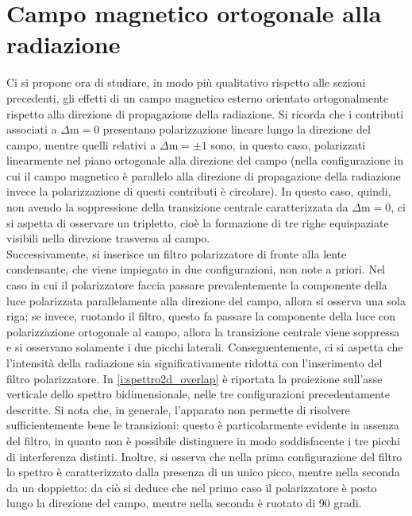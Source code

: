 \documentclass[twocolumn,10pt]{asme2ej}
\begin{document}


\vspace{-10pt}
\section{Campo magnetico ortogonale alla radiazione}\label{s:ortogonale}

Ci si propone ora di studiare, in modo più qualitativo rispetto alle sezioni precedenti, gli effetti di un campo
magnetico esterno orientato ortogonalmente rispetto alla direzione di propagazione della radiazione. Si  ricorda che i
contributi associati a $\Delta \text{m} = 0$ presentano polarizzazione lineare lungo la direzione del campo, mentre
quelli relativi a $\Delta \text{m} = \pm 1$ sono, in questo caso, polarizzati linearmente nel piano ortogonale alla
direzione del campo (nella configurazione in cui il campo magnetico è parallelo alla direzione di propagazione della
radiazione invece la polarizzazione di questi contributi è circolare). In questo caso, quindi, non avendo la
soppressione della transizione centrale caratterizzata da $\Delta \text{m} = 0$, ci si aspetta di osservare un
tripletto, cioè la formazione di tre righe equispaziate visibili nella direzione trasversa al campo. \\
Successivamente, si inserisce un filtro polarizzatore di fronte alla lente condensante, che viene impiegato in due
configurazioni, non note a priori. Nel caso in cui il polarizzatore faccia passare prevalentemente la componente della
luce polarizzata parallelamente alla direzione del campo, allora si osserva una sola riga; se invece, ruotando il
filtro, questo fa passare la componente della luce con polarizzazione ortogonale al campo, allora la transizione
centrale viene soppressa e si osservano solamente i due picchi laterali. Conseguentemente, ci si aspetta che l'intensità
della radiazione sia significativamente ridotta con l'inserimento del filtro polarizzatore.  
In \autoref{i:spettro2d_overlap} è riportata la proiezione sull'asse verticale dello spettro bidimensionale, nelle tre
configurazioni precedentamente descritte. Si nota che, in generale, l'apparato non permette di risolvere
sufficientemente bene le transizioni: questo è particolarmente evidente in assenza del filtro, in quanto non è possibile
distinguere in modo soddisfacente i tre picchi di interferenza distinti. Inoltre, si osserva che nella prima
configurazione del filtro lo spettro è caratterizzato dalla presenza di un unico picco, mentre nella seconda da un
doppietto: da ciò si deduce che nel primo caso il polarizzatore è posto lungo la direzione del campo, mentre nella
seconda è ruotato di 90 gradi. 
\end{document}
